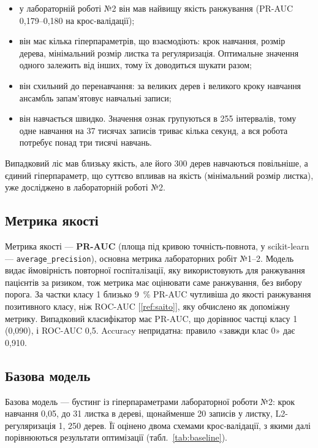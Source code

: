 \documentclass[14pt,a4paper]{extreport}
\begin{document}
\begin{itemize}
\item у лабораторній роботі №2 він мав найвищу якість ранжування (PR-AUC 0,179--0,180 на крос-валідації);
\item він має кілька гіперпараметрів, що взаємодіють: крок навчання, розмір дерева, мінімальний розмір листка та регуляризація. Оптимальне значення одного залежить від інших, тому їх доводиться шукати разом;
\item він схильний до перенавчання: за великих дерев і великого кроку навчання ансамбль запам'ятовує навчальні записи;
\item він навчається швидко. Значення ознак групуються в 255 інтервалів, тому одне навчання на 37 тисячах записів триває кілька секунд, а вся робота потребує понад три тисячі навчань.
\end{itemize}

Випадковий ліс мав близьку якість, але його 300 дерев навчаються повільніше, а єдиний гіперпараметр, що суттєво впливав на якість (мінімальний розмір листка), уже досліджено в лабораторній роботі №2.

\subsection{Метрика якості}

Метрика якості --- \textbf{PR-AUC} (площа під кривою точність-повнота, у scikit-learn --- \texttt{average\_precision}), основна метрика лабораторних робіт №1--2. Модель видає ймовірність повторної госпіталізації, яку використовують для ранжування пацієнтів за ризиком, тож метрика має оцінювати саме ранжування, без вибору порога. За частки класу 1 близько 9~\% PR-AUC чутливіша до якості ранжування позитивного класу, ніж ROC-AUC [\ref{ref:saito}], яку обчислено як допоміжну метрику. Випадковий класифікатор має PR-AUC, що дорівнює частці класу 1 (0,090), і ROC-AUC 0,5. Accuracy непридатна: правило «завжди клас 0» дає 0,910.

\subsection{Базова модель}

Базова модель --- бустинг із гіперпараметрами лабораторної роботи №2: крок навчання 0,05, до 31 листка в дереві, щонайменше 20 записів у листку, L2-регуляризація 1, 250 дерев. Її оцінено двома схемами крос-валідації, з якими далі порівнюються результати оптимізації (табл.~\ref{tab:baseline}).
\end{document}
